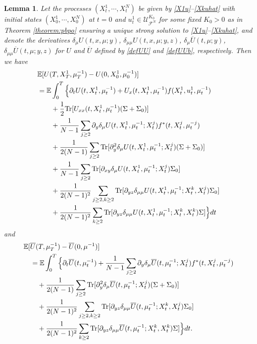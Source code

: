 \documentclass{amsart}
\newtheorem{lemma}[theorem]{Lemma}
\theoremstyle{definition}
\theoremstyle{remark}
\def\EE{{\mathbb E}}
\numberwithin{equation}{section}
\begin{document}
\begin{lemma}\label{lemma:Uintrep}
Let the processes $(X^1_t, \cdots, X_t^N)$ be given by \eqref{X1u}--\eqref{Xkuhat}
with initial states  $(X^1_0, \cdots, X_0^N)$ at $t=0$ and $u_t^1\in{\mathcal U}_{{\mathcal F}^N}^{K_0}$ for some fixed $K_0>0$ as in Theorem \ref{theorem:pbpo} ensuring a unique strong solution to \eqref{X1u}--\eqref{Xkuhat}, and denote the derivatives $\delta_\mu U(t, x, \mu; y)$, $\delta_{\mu\mu} U(t, x, \mu; y,z)$, $\delta_\mu\overline U(t, \mu;y)$, $\delta_{\mu\mu}\overline U(t, \mu; y,z)$ for $U$ and $\overline U$ defined by \eqref{defUU} and \eqref{defUUb}, respectively. Then  we have
\begin{align}
&\EE [U(T, X_T^1, \mu_T^{-1})  - U(0, X_0^1, \mu_0^{-1} )] \label{Urep}\\
& = \EE \int_0^T\Big\{\partial_t U(t, X^1_t, \mu_t^{-1}) + U_{x}(t, X^1_t, \mu_t^{-1}) f(X_t^1, u^1_t, \mu_t^{-1}) \notag \\
&\qquad +\frac{1}{2} {\rm Tr}[ U_{xx}(t, X^1_t, \mu_t^{-1}) (\Sigma+\Sigma_0)]\notag \\
&\qquad  + \frac{1}{N-1}\sum_{j\ge 2} \partial_{y}\delta_\mu U(t, X^1_t,\mu_t^{-1}; X^j_t)f^*(t, X_t^j, \mu_t^{-j}) \notag \\
&\qquad + \frac{1}{2(N-1)}\sum_{j\ge 2 }{\rm Tr}[ \partial_{y}^2\delta_\mu U(t, X^1_t,\mu_t^{-1}; X^j_t)(\Sigma+\Sigma_0)] \notag\\
&\qquad  + \frac{1}{N-1}\sum_{j\ge 2  }{\rm Tr} [\partial_{xy}\delta_\mu U(t, X^1_t,\mu_t^{-1}; X^j_t)\Sigma_0 ]\notag\\
&\qquad  +   \frac{1}{2(N-1)^2}\sum_{j\ge 2,k\ge 2  } {\rm Tr[}\partial_{yz}
\delta_{\mu\mu}
U(t, X^1_t,\mu_t^{-1};X_t^k, X^j_t)\Sigma_0 ]\notag\\
&\qquad  +   \frac{1}{2(N-1)^2}\sum_{k\ge 2  }{\rm Tr[} \partial_{yz}
\delta_{\mu\mu}
U(t, X^1_t,\mu_t^{-1};X_t^k, X^k_t)\Sigma] \Big\}dt\notag
\end{align}
and
\begin{align}
&\EE [\overline U(T,  \mu_T^{-1})  - \overline U(0, \mu^{-1} )]\label{bUrep} \\
&\quad =\EE\int_0^T \Big\{ \partial_t \overline U(t, \mu_t^{-1})+ \frac{1}{N-1}\sum_{j\ge 2} \partial_{y}\delta_\mu \overline U(t, \mu_t^{-1}; X^j_t)f^*(t, X_t^j, \mu_t^{-j}) \notag \\
&\qquad + \frac{1}{2(N-1)}\sum_{j\ge 2 }{\rm Tr}[ \partial_{y}^2\delta_\mu \overline U(t, \mu_t^{-1}; X^j_t)(\Sigma+\Sigma_0) ]\notag \\
&\qquad+   \frac{1}{2(N-1)^2}\sum_{j\ge 2,k\ge 2  }{\rm Tr[} \partial_{yz}
\delta_{\mu\mu}
\overline U(t, \mu_t^{-1};X_t^k, X^j_t)\Sigma_0 ]\notag \\
&\qquad+   \frac{1}{2(N-1)^2}\sum_{k\ge 2  } {\rm Tr}[ \partial_{yz}
\delta_{\mu\mu}
\overline U(t,\mu_t^{-1};X_t^k, X^k_t)\Sigma]  \Big\}dt. \notag
\end{align}
\end{lemma}
\end{document}
